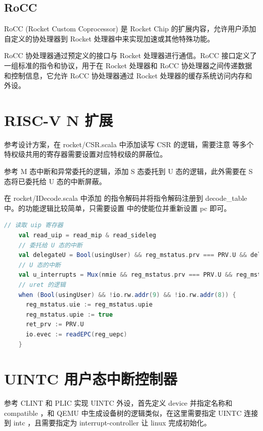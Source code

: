 \subsection{RoCC}

RoCC (Rocket Custom Coprocessor) \cite{rocc} 是 Rocket Chip 的扩展内容，允许用户添加自定义的协处理器到 Rocket 处理器中来实现加速或其他特殊功能。

RoCC 协处理器通过预定义的接口与 Rocket 处理器进行通信。RoCC 接口定义了一组标准的指令和协议，用于在 Rocket 处理器和 RoCC 协处理器之间传递数据和控制信息，它允许 RoCC 协处理器通过 Rocket 处理器的缓存系统访问内存和外设。

\section{RISC-V N 扩展}

参考设计方案，在 rocket/CSR.scala 中添加读写 CSR 的逻辑，需要注意 \Ruip 等多个特权级共用的寄存器需要设置对应特权级的屏蔽位。

参考 M 态中断和异常委托的逻辑，添加 S 态委托到 U 态的逻辑，此外需要在 S 态将已委托给 U 态的中断屏蔽。

在 rocket/IDecode.scala 中添加 \Iuret 的指令解码并将指令解码注册到 decode\_table 中。\Iuret 的功能逻辑比较简单，只需要设置 \Rustatus 中的使能位并重新设置 pc 即可。

\begin{lstlisting}[style=CStyle,language=scala]
    // 读取 uip 寄存器
    val read_uip = read_mip & read_sideleg
    // 委托给 U 态的中断
    val delegateU = Bool(usingUser) && reg_mstatus.prv === PRV.U && delegate && read_sideleg(cause_lsbs) && cause(xLen - 1)
    // U 态的中断
    val u_interrupts = Mux(nmie && reg_mstatus.prv === PRV.U && reg_mstatus.uie, pending_interrupts & read_sideleg, UInt(0))
    // uret 的逻辑
    when (Bool(usingUser) && !io.rw.addr(9) && !io.rw.addr(8)) {
      reg_mstatus.uie := reg_mstatus.upie
      reg_mstatus.upie := true
      ret_prv := PRV.U
      io.evec := readEPC(reg_uepc)
    }
\end{lstlisting}

\section{UINTC 用户态中断控制器}

参考 CLINT 和 PLIC 实现 UINTC 外设，首先定义 device 并指定名称和 compatible ，和 QEMU 中生成设备树的逻辑类似，在这里需要指定 UINTC 连接到 intc ，且需要指定为 interrupt-controller 让 linux 完成初始化。

